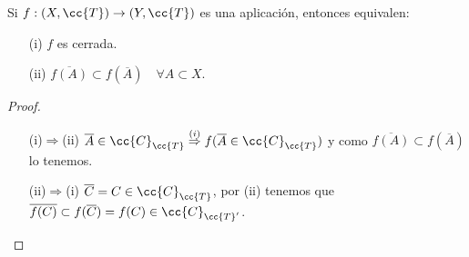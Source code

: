 \begin{prop}
    Si $f:(X, \cc{T}) \to (Y,\cc{T})$ es una aplicación, entonces equivalen:
    \begin{enumerate}
        \item[(i)] $f$ es cerrada.
        \item[(ii)] $\overline{f(A)}\subset f(\overline{A})$\ \ $\forall A \subset X$.
    \end{enumerate}
    \begin{proof}\
        \begin{itemize}
            \item[(i)$\Rightarrow$(ii)] $\overline{A}\in \cc{C}_{\cc{T}} \overset{(i)}{\Rightarrow} f(\overline{A}\in \cc{C}_{\cc{T}})$ y como  $\overline{f(A)} \subset f(\overline{A})$ lo tenemos.
            \item[(ii)$\Rightarrow$(i)] $\overline{C}=C\in \cc{C}_{\cc{T}}$, por (ii) tenemos que $\overline{f(C)}\subset f(\overline{C})= f(C) \in \cc{C}_{\cc{T}'}$. 
        \end{itemize}
    \end{proof}
\end{prop}

